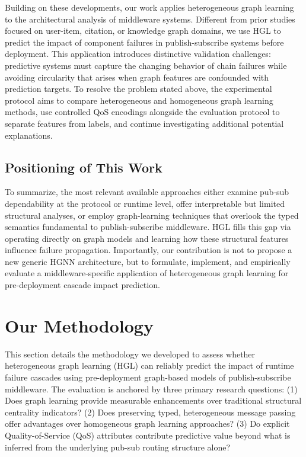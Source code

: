 \documentclass[sigconf,9pt,anonymous]{acmart}
\begin{document}
Building on these developments, our work applies heterogeneous graph learning to the architectural analysis of middleware systems. Different from prior studies focused on user-item, citation, or knowledge graph domains, we use HGL to predict the impact of component failures in publish-subscribe systems before deployment. This application introduces distinctive validation challenges: predictive systems must capture the changing behavior of chain failures while avoiding circularity that arises when graph features are confounded with prediction targets. To resolve the problem stated above, the experimental protocol aims to compare heterogeneous and homogeneous graph learning methods, use controlled QoS encodings alongside the evaluation protocol to separate features from labels, and continue investigating additional potential explanations.

\subsection{Positioning of This Work}

To summarize, the most relevant available approaches either examine pub-sub dependability at the protocol or runtime level, offer interpretable but limited structural analyses, or employ graph-learning techniques that overlook the typed semantics fundamental to publish-subscribe middleware. HGL fills this gap via operating directly on graph models and learning how these structural features influence failure propagation. Importantly, our contribution is not to propose a new generic HGNN architecture, but to formulate, implement, and empirically evaluate a middleware-specific application of heterogeneous graph learning for pre-deployment cascade impact prediction.

\section{Our Methodology}

This section details the methodology we developed to assess whether heterogeneous graph learning (HGL) can reliably predict the impact of runtime failure cascades using pre-deployment graph-based models of publish-subscribe middleware. The evaluation is anchored by three primary research questions: (1) Does graph learning provide measurable enhancements over traditional structural centrality indicators? (2) Does preserving typed, heterogeneous message passing offer advantages over homogeneous graph learning approaches? (3) Do explicit Quality-of-Service (QoS) attributes contribute predictive value beyond what is inferred from the underlying pub-sub routing structure alone?
\end{document}
